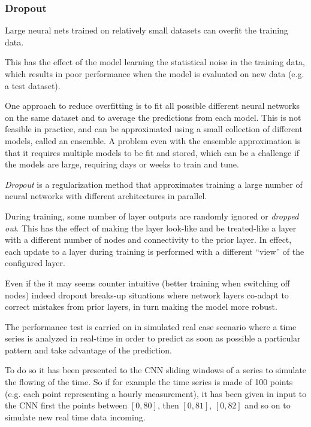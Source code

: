 \begin{attention}
\subsubsection{Dropout}

Large neural nets trained on relatively small datasets can overfit the
training data.

This has the effect of the model learning the statistical noise in the
training data, which results in poor performance when the model is
evaluated on new data (e.g. a test dataset).

One approach to reduce overfitting is to fit all possible different
neural networks on the same dataset and to average the predictions from
each model. This is not feasible in practice, and can be approximated
using a small collection of different models, called an ensemble. A
problem even with the ensemble approximation is that it requires
multiple models to be fit and stored, which can be a challenge if the
models are large, requiring days or weeks to train and tune.

\emph{Dropout} is a regularization method that approximates training a
large number of neural networks with different architectures in
parallel.

During training, some number of layer outputs are randomly ignored or
\emph{dropped out}. This has the effect of making the layer look-like
and be treated-like a layer with a different number of nodes and
connectivity to the prior layer. In effect, each update to a layer
during training is performed with a different ``view'' of the configured
layer.

Even if the it may seems counter intuitive (better training when
switching off nodes) indeed dropout breaks-up situations where network
layers co-adapt to correct mistakes from prior layers, in turn making
the model more robust.
\end{attention}

The performance test is carried on in simulated real case scenario where
a time series is analyzed in real-time in order to predict as soon as
possible a particular pattern and take advantage of the prediction.

To do so it has been presented to the CNN sliding windows of a series
to simulate the flowing of the time. So if for example the time series is made
of 100 points (e.g. each point representing a hourly measurement),
it has been given in input to the CNN first the points between
\([0, 80]\), then \([0, 81]\), \([0, 82]\) and so on to simulate new real
time data incoming. 

